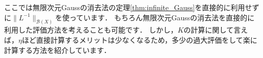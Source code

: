 ここでは無限次元Gaussの消去法の定理\ref{thm:infinite_Gauss}を直接的に利用せずに$\| L^{-1} \|_{{\mathcal B}(X)}$を使っています．
もちろん無限次元Gaussの消去法を直接的に利用した評価方法を考えることも可能です．
しかし，$K$の計算に関して言えば，$\eta$ほど直接計算するメリットは少なくなるため，多少の過大評価をして楽に計算する方法を紹介しています．


